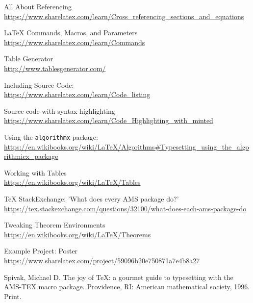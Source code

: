 \documentclass[11pt,letterpaper,titlepage]{article}
\numberwithin{equation}{section}
\numberwithin{figure}{section}
\numberwithin{table}{section}
\numberwithin{algorithm}{section}
\theoremstyle{definition}
\begin{document}
\begin{thebibliography}{20}

All About Referencing\\
\url{https://www.sharelatex.com/learn/Cross\_referencing\_sections\_and\_equations}

{\LaTeX} Commands, Macros, and Parameters\\
\url{https://www.sharelatex.com/learn/Commands}

Table Generator\\
\url{http://www.tablesgenerator.com/}

Including Source Code:\\
\url{https://www.sharelatex.com/learn/Code\_listing}

Source code with syntax highlighting\\ \url{https://www.sharelatex.com/learn/Code\_Highlighting\_with\_minted}

Using the \verb$algorithmx$ package:
\url{https://en.wikibooks.org/wiki/LaTeX/Algorithms#Typesetting_using_the_algorithmicx_package}

Working with Tables\\ \url{https://en.wikibooks.org/wiki/LaTeX/Tables}

{\TeX} StackExchange: 'What does every AMS package do?'\\ \url{https://tex.stackexchange.com/questions/32100/what-does-each-ams-package-do}

Tweaking Theorem Environments\\ \url{https://en.wikibooks.org/wiki/LaTeX/Theorems}

Example Project: Poster\\
\url{https://www.sharelatex.com/project/59096b20e750871a7e4b8a27}

Spivak, Michael D. The joy of {\TeX}: a gourmet guide to typesetting with the AMS-TEX macro package. Providence, RI: American mathematical society, 1996. Print.

\end{thebibliography}
\end{document}
